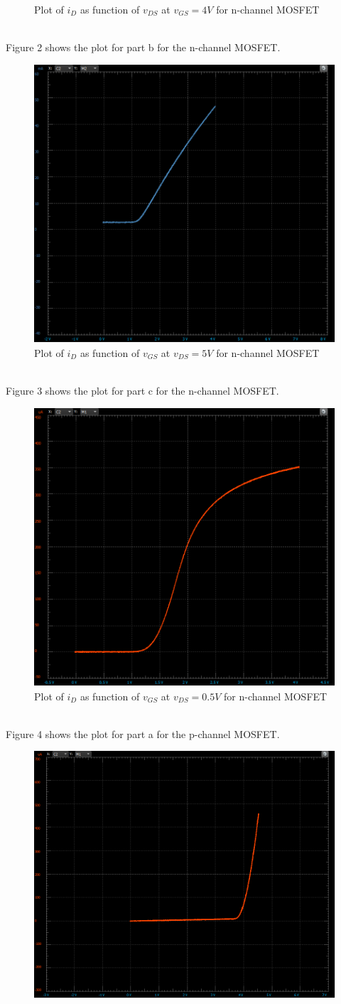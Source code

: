\documentclass[12pt]{article}
\begin{document}
\begin{enumerate}
\begin{enumerate}
\begin{figure}[h!]
            \caption{Plot of $i_D$ as function of $v_{DS}$ at $v_{GS} = 4V$ for n-channel MOSFET}
        \end{figure} \\
        Figure 2 shows the plot for part b for the n-channel MOSFET.
        \begin{figure}[h!]
            \centering
            \includegraphics[width=0.5\linewidth]{NBVD5.png}
            \caption{Plot of $i_D$ as function of $v_{GS}$ at $v_{DS} = 5V$ for n-channel MOSFET}                        
        \end{figure} \pagebreak \\
        Figure 3 shows the plot for part c for the n-channel MOSFET.
        \begin{figure}[h!]
            \centering
            \includegraphics[width=0.5\linewidth]{NCVD50.png}
            \caption{Plot of $i_D$ as function of $v_{GS}$ at $v_{DS} = 0.5V$ for n-channel MOSFET}                        
        \end{figure} \\
        Figure 4 shows the plot for part a for the p-channel MOSFET.
        \begin{figure}[h!]
            \centering
            \includegraphics[width=0.5\linewidth]{PAVG3.png}

\end{figure}
\end{enumerate}
\end{enumerate}
\end{document}
